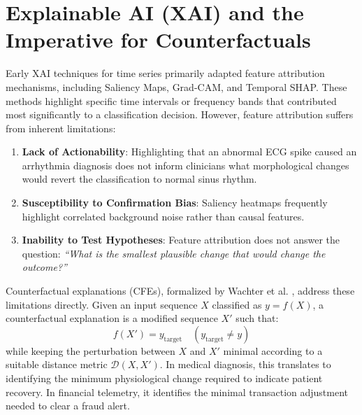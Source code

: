 \documentclass[11pt,a4paper]{report}
\begin{document}
\section{Explainable AI (XAI) and the Imperative for Counterfactuals}
Early XAI techniques for time series primarily adapted feature attribution mechanisms, including Saliency Maps, Grad-CAM, and Temporal SHAP. These methods highlight specific time intervals or frequency bands that contributed most significantly to a classification decision. However, feature attribution suffers from inherent limitations:
\begin{enumerate}[label=(\roman*)]
    \item \textbf{Lack of Actionability}: Highlighting that an abnormal ECG spike caused an arrhythmia diagnosis does not inform clinicians what morphological changes would revert the classification to normal sinus rhythm.
    \item \textbf{Susceptibility to Confirmation Bias}: Saliency heatmaps frequently highlight correlated background noise rather than causal features.
    \item \textbf{Inability to Test Hypotheses}: Feature attribution does not answer the question: \textit{``What is the smallest plausible change that would change the outcome?''}
\end{enumerate}

Counterfactual explanations (CFEs), formalized by Wachter et al. \cite{wachter2017counterfactual}, address these limitations directly. Given an input sequence $X$ classified as $y = f(X)$, a counterfactual explanation is a modified sequence $X'$ such that:
\begin{equation}
    f(X') = y_{\text{target}} \quad (y_{\text{target}} \neq y)
\end{equation}
while keeping the perturbation between $X$ and $X'$ minimal according to a suitable distance metric $\mathcal{D}(X, X')$. In medical diagnosis, this translates to identifying the minimum physiological change required to indicate patient recovery. In financial telemetry, it identifies the minimal transaction adjustment needed to clear a fraud alert.
\end{document}
